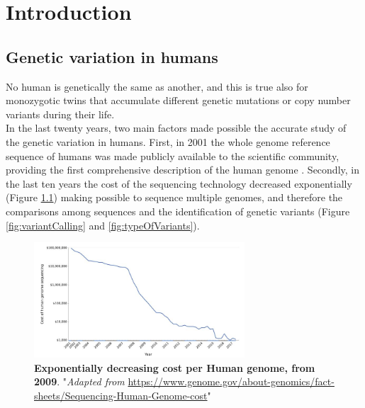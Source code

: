 
\chapter{Introduction} %

\label{Chapter1} %


\newcommand{\keyword}[1]{\textbf{#1}}
\newcommand{\tabhead}[1]{\textbf{#1}}
\newcommand{\code}[1]{\texttt{#1}}
\newcommand{\file}[1]{\texttt{\bfseries#1}}
\newcommand{\option}[1]{\texttt{\itshape#1}}



\section {Genetic variation in humans }

No human is genetically the same as another, and this is true also for monozygotic twins that accumulate different genetic mutations or copy number variants during their life.\\ 

In the last twenty years, two main factors made possible the accurate study of the genetic variation in humans. First, in 2001 the whole genome reference sequence of humans was made publicly available to the scientific community, providing the first comprehensive description of the human genome \cite{lander2001initial, venter2001sequence}. Secondly, in the last ten years the cost of the sequencing technology decreased exponentially \cite{christensen2015assessing} (Figure \ref{fig:costPerGenome}) making possible to sequence multiple genomes, and therefore the comparisons among sequences and the identification of genetic variants (Figure \ref{fig:variantCalling} and \ref{fig:typeOfVariants}).\\  

\begin{figure}[H]
\centering
\includegraphics[width=0.7\textwidth]{fig/costPerGenome.png}
\decoRule
\caption{\textbf{Exponentially decreasing cost per Human genome, from 2009}. "\textit{Adapted from} \url{https://www.genome.gov/about-genomics/fact-sheets/Sequencing-Human-Genome-cost}"} 
\label{fig:costPerGenome}
\end{figure}

